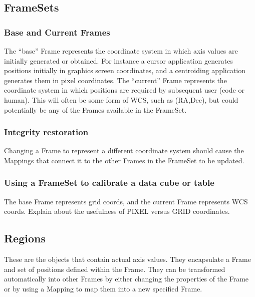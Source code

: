 \documentclass[final,authoryear,5p,times,twocolumn]{elsarticle}
\begin{document}
\subsection{FrameSets}

\subsubsection{Base and Current Frames}

The ``base'' Frame represents the coordinate system in which axis values
are initially generated or obtained. For instance a cursor application
generates positions initially in graphics screen coordinates, and a
centroiding application generates them in pixel coordinates.  The
``current'' Frame represents the coordinate system in which positions
are required by subsequent user (code or human). This will often be
some form of WCS, such as (RA,Dec), but could potentially be any of
the Frames available in the FrameSet.

\subsubsection{Integrity restoration}

Changing a Frame to represent a different coordinate system should
cause the Mappings that connect it to the other Frames in the FrameSet
to be updated.

\subsubsection{Using a FrameSet to calibrate a data cube or table}

The base Frame represents grid coords, and the current Frame
represents WCS coords.  Explain about the usefulness of PIXEL versus
GRID coordinates.

\subsection{Regions}

These are the objects that contain actual axis values. They
encapsulate a Frame and set of positions defined within the
Frame. They can be transformed automatically into other Frames by
either changing the properties of the Frame or by using a Mapping to
map them into a new specified Frame.
\end{document}

